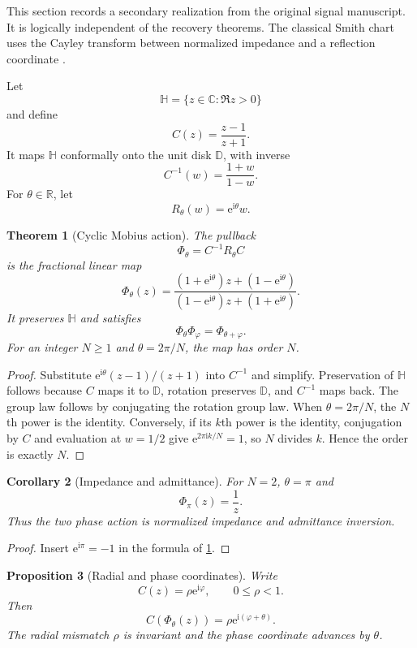 \documentclass[11pt,a4paper]{article}
\newtheorem{theorem}{Theorem}[section]
\newtheorem{proposition}[theorem]{Proposition}
\newtheorem{corollary}[theorem]{Corollary}
\theoremstyle{definition}
\theoremstyle{remark}
\newcommand{\ii}{\mathrm i}
\newcommand{\CC}{\mathbb C}
\newcommand{\RR}{\mathbb R}
\newcommand{\e}{\mathrm e}
\begin{document}
This section records a secondary realization from the original signal manuscript. It is logically independent of the recovery theorems. The classical Smith chart uses the Cayley transform between normalized impedance and a reflection coordinate \cite{Smith1969}.

Let
\[
\mathbb H
=
\{z\in\CC:\Re z>0\}
\]
and define
\[
C(z)=\frac{z-1}{z+1}.
\]
It maps \(\mathbb H\) conformally onto the unit disk \(\mathbb D\), with inverse
\[
C^{-1}(w)=\frac{1+w}{1-w}.
\]
For \(\theta\in\RR\), let
\[
R_\theta(w)=\e^{\ii\theta}w.
\]

\begin{theorem}[Cyclic Mobius action]\label{thm:cyclic_mobius}
The pullback
\[
\Phi_\theta
=C^{-1}R_\theta C
\]
is the fractional linear map
\[
\boxed{
\Phi_\theta(z)
=
\frac{(1+\e^{\ii\theta})z+(1-\e^{\ii\theta})}
{(1-\e^{\ii\theta})z+(1+\e^{\ii\theta})}.
}
\]
It preserves \(\mathbb H\) and satisfies
\[
\Phi_\theta\Phi_\varphi
=
\Phi_{\theta+\varphi}.
\]
For an integer \(N\geq1\) and \(\theta=2\pi/N\), the map has order \(N\).
\end{theorem}

\begin{proof}
Substitute \(\e^{\ii\theta}(z-1)/(z+1)\) into \(C^{-1}\) and simplify. Preservation of \(\mathbb H\) follows because \(C\) maps it to \(\mathbb D\), rotation preserves \(\mathbb D\), and \(C^{-1}\) maps back. The group law follows by conjugating the rotation group law. When \(\theta=2\pi/N\), the \(N\)th power is the identity. Conversely, if its \(k\)th power is the identity, conjugation by \(C\) and evaluation at \(w=1/2\) give \(\e^{2\pi\ii k/N}=1\), so \(N\) divides \(k\). Hence the order is exactly \(N\).
\end{proof}

\begin{corollary}[Impedance and admittance]\label{cor:impedance_admittance}
For \(N=2\), \(\theta=\pi\) and
\[
\Phi_\pi(z)=\frac1z.
\]
Thus the two phase action is normalized impedance and admittance inversion.
\end{corollary}

\begin{proof}
Insert \(\e^{\ii\pi}=-1\) in the formula of \cref{thm:cyclic_mobius}.
\end{proof}

\begin{proposition}[Radial and phase coordinates]\label{prop:radial_phase}
Write
\[
C(z)=\rho\e^{\ii\varphi},
\qquad
0\leq\rho<1.
\]
Then
\[
C(\Phi_\theta(z))
=
\rho\e^{\ii(\varphi+\theta)}.
\]
The radial mismatch \(\rho\) is invariant and the phase coordinate advances by \(\theta\).
\end{proposition}
\end{document}
